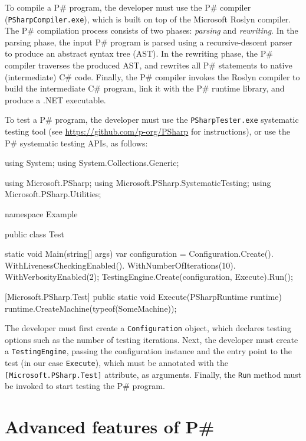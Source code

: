 \documentclass{llncs}
\newcommand{\ps}{P\#\xspace}
\newcommand{\cs}{C\#\xspace}
\begin{document}
To compile a \ps program, the developer must use the \ps compiler (\texttt{PSharpCompiler.exe}), which is built on top of the Microsoft Roslyn compiler. The \ps compilation process consists of two phases: \emph{parsing} and \emph{rewriting}. In the parsing phase, the input \ps program is parsed using a recursive-descent parser to produce an abstract syntax tree (AST). In the rewriting phase, the \ps compiler traverses the produced AST, and rewrites all \ps statements to native (intermediate) \cs code. Finally, the \ps compiler invokes the Roslyn compiler to build the intermediate \cs program, link it with the \ps runtime library, and produce a .NET executable.

To test a \ps program, the developer must use the \texttt{PSharpTester.exe} systematic testing tool (see \textcolor{blue}{\url{https://github.com/p-org/PSharp}} for instructions), or use the \ps systematic testing APIs, as follows:

\begin{psharp}
using System;
using System.Collections.Generic;

using Microsoft.PSharp;
using Microsoft.PSharp.SystematicTesting;
using Microsoft.PSharp.Utilities;

namespace Example
{
    public class Test
    {
        static void Main(string[] args)
        {
            var configuration = Configuration.Create().
                WithLivenessCheckingEnabled().
                WithNumberOfIterations(10).
                WithVerbosityEnabled(2);
            TestingEngine.Create(configuration, Execute).Run();
        }

        [Microsoft.PSharp.Test]
        public static void Execute(PSharpRuntime runtime)
        {
            runtime.CreateMachine(typeof(SomeMachine));
        }
    }
}
\end{psharp}

The developer must first create a \texttt{Configuration} object, which declares testing options such as the number of testing iterations. Next, the developer must create a \texttt{TestingEngine}, passing the configuration instance and the entry point to the test (in our case \texttt{Execute}), which must be annotated with the \texttt{[Microsoft.PSharp.Test]} attribute, as arguments. Finally, the \texttt{Run} method must be invoked to start testing the \ps program.

\section{Advanced features of \ps}
\label{sec:advanced}
\end{document}
